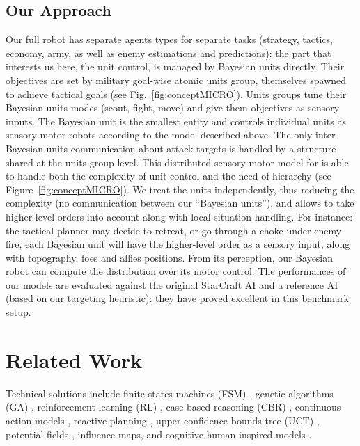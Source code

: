 \subsection{Our Approach}
Our full robot has separate agents types for separate tasks (strategy, tactics, economy, army, as well as enemy estimations and predictions): the part that interests us here, the unit control, is managed by Bayesian units directly. Their objectives are set by military goal-wise atomic units group, themselves spawned to achieve tactical goals (see Fig.~\ref{fig:conceptMICRO}). Units groups tune their Bayesian units modes (scout, fight, move) and give them objectives as sensory inputs. The Bayesian unit is the smallest entity and controls individual units as sensory-motor robots according to the model described above. The only inter Bayesian units communication about attack targets is handled by a structure shared at the units group level. This distributed sensory-motor model for  is able to handle both the complexity of unit control and the need of hierarchy (see Figure~\ref{fig:conceptMICRO}). We treat the units independently, thus reducing the complexity (no communication between our ``Bayesian units''), and allows to take higher-level orders into account along with local situation handling. For instance: the tactical planner may decide to retreat, or go through a choke under enemy fire, each Bayesian unit will have the higher-level order as a sensory input, along with topography, foes and allies positions. From its perception, our Bayesian robot \citep{Lebeltel04} can compute the distribution over its motor control. The performances of our models are evaluated against the original StarCraft AI and a reference AI (based on our targeting heuristic): they have proved excellent in this benchmark setup.


\section{Related Work}
Technical solutions include finite states machines (FSM) \citep{FSM}, genetic algorithms (GA) \citep{GA,Bakkes04,teamCompositionRTS}, reinforcement learning (RL) \citep{Marthi05concurrenthierarchical,Madeira06}, case-based reasoning (CBR) \citep{LTW,CBR-RL}, continuous action models \citep{Molineaux08}, reactive planning \citep{WeberCIG10}, upper confidence bounds tree (UCT) \citep{UCT}, potential fields \citep{Hagelback2009}, influence maps\citep{teamCompositionRTS}, and cognitive human-inspired models \citep{SORTS}.


